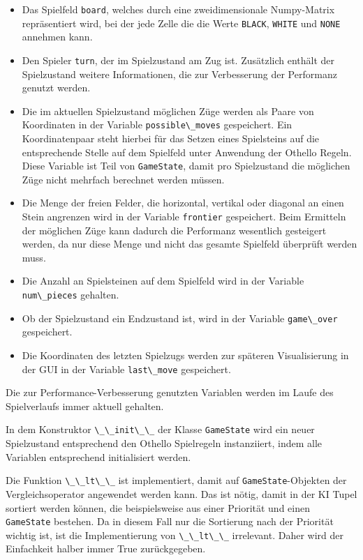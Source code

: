 \begin{itemize}
\tightlist
\item
  Das Spielfeld \passthrough{\lstinline!board!}, welches durch eine
  zweidimensionale Numpy-Matrix repräsentiert wird, bei der jede Zelle
  die die Werte \passthrough{\lstinline!BLACK!},
  \passthrough{\lstinline!WHITE!} und \passthrough{\lstinline!NONE!}
  annehmen kann.
\item
  Den Spieler \passthrough{\lstinline!turn!}, der im Spielzustand am Zug
  ist. Zusätzlich enthält der Spielzustand weitere Informationen, die
  zur Verbesserung der Performanz genutzt werden.
\item
  Die im aktuellen Spielzustand möglichen Züge werden als Paare von
  Koordinaten in der Variable \passthrough{\lstinline!possible\_moves!}
  gespeichert. Ein Koordinatenpaar steht hierbei für das Setzen eines
  Spielsteins auf die entsprechende Stelle auf dem Spielfeld unter
  Anwendung der Othello Regeln. Diese Variable ist Teil von
  \passthrough{\lstinline!GameState!}, damit pro Spielzustand die
  möglichen Züge nicht mehrfach berechnet werden müssen.
\item
  Die Menge der freien Felder, die horizontal, vertikal oder diagonal an
  einen Stein angrenzen wird in der Variable
  \passthrough{\lstinline!frontier!} gespeichert. Beim Ermitteln der
  möglichen Züge kann dadurch die Performanz wesentlich gesteigert
  werden, da nur diese Menge und nicht das gesamte Spielfeld überprüft
  werden muss.
\item
  Die Anzahl an Spielsteinen auf dem Spielfeld wird in der Variable
  \passthrough{\lstinline!num\_pieces!} gehalten.
\item
  Ob der Spielzustand ein Endzustand ist, wird in der Variable
  \passthrough{\lstinline!game\_over!} gespeichert.
\item
  Die Koordinaten des letzten Spielzugs werden zur späteren
  Visualisierung in der \ac{GUI} in der Variable
  \passthrough{\lstinline!last\_move!} gespeichert.
\end{itemize}

Die zur Performance-Verbesserung genutzten Variablen werden im Laufe des
Spielverlaufs immer aktuell gehalten.

In dem Konstruktor \passthrough{\lstinline!\_\_init\_\_!} der Klasse
\passthrough{\lstinline!GameState!} wird ein neuer Spielzustand
entsprechend den Othello Spielregeln instanziiert, indem alle Variablen
entsprechend initialisiert werden.

Die Funktion \passthrough{\lstinline!\_\_lt\_\_!} ist implementiert,
damit auf \passthrough{\lstinline!GameState!}-Objekten der
Vergleichsoperator angewendet werden kann. Das ist nötig, damit in der
\ac{KI} Tupel sortiert werden können, die beispielsweise aus einer
Priorität und einen \passthrough{\lstinline!GameState!} bestehen. Da in
diesem Fall nur die Sortierung nach der Priorität wichtig ist, ist die
Implementierung von \passthrough{\lstinline!\_\_lt\_\_!} irrelevant.
Daher wird der Einfachkeit halber immer True zurückgegeben.

